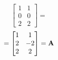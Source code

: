\begin{enumerate}[label=(\alph*)]
\[\begin{bmatrix}
                    1 & 1 \\
                    0 & 0 \\
                    2 & 2
                \end{bmatrix}
                =
            \]
            \[
                =
                \begin{bmatrix}
                    1 & 1 \\
                    2 & -2 \\
                    2 & 2
                \end{bmatrix}
                =
                \bold{A}
            \]
        \end{enumerate}